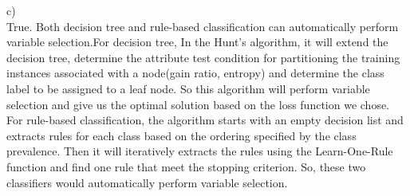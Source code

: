 \documentclass[12pt]{article}
\begin{document}
c)\\

True. Both decision tree and rule-based classification can automatically perform variable selection.For decision tree, In the Hunt's algorithm, it will extend the decision tree, determine the attribute test condition for partitioning the training instances associated with a node(gain ratio, entropy) and determine the class label to be assigned to a leaf node. So this algorithm will perform variable selection and give us the optimal solution based on the loss function we chose. For rule-based classification, the algorithm  starts with an empty decision list and extracts rules for each class based on the ordering specified by the class prevalence. Then it will iteratively extracts the rules using the Learn-One-Rule function and find one rule that meet the stopping criterion. So, these two classifiers would 
automatically perform variable selection.
\end{document}
